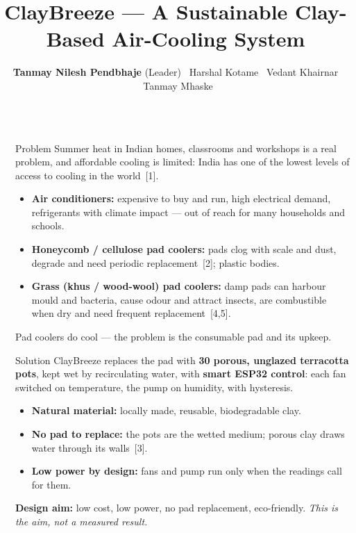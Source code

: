 \documentclass[final]{beamer}
\title{ClayBreeze --- A Sustainable Clay-Based Air-Cooling System}
\author{\textbf{Tanmay Nilesh Pendbhaje} (Leader) \textperiodcentered\ Harshal Kotame \textperiodcentered\ Vedant Khairnar \textperiodcentered\ Tanmay Mhaske}
\institute{Project Guide: \textbf{Dr.~Kiran Wakchaure} \textperiodcentered\ FY B.Tech Mechanical Engineering, Sanjivani University}
\date{}
\newlength{\sepwid}\setlength{\sepwid}{0.01\paperwidth}
\newlength{\firstcolwid}\setlength{\firstcolwid}{0.215\paperwidth}
\newcommand{\emphg}[1]{{\color{paloalto}\textbf{#1}}}
\newcommand{\emphr}[1]{{\color{cardinalred}\textbf{#1}}}
\begin{document}
\begin{frame}[t]
\begin{columns}[t]

\begin{column}{\sepwid}\end{column}

\begin{column}{\firstcolwid}

\begin{alertblock}{Problem}
Summer heat in Indian homes, classrooms and workshops is a real problem, and affordable cooling is limited: India has one of the lowest levels of access to cooling in the world~[1].
\begin{itemize}
\item \textbf{Air conditioners:} expensive to buy and run, high electrical demand, refrigerants with climate impact --- out of reach for many households and schools.
\item \textbf{Honeycomb / cellulose pad coolers:} pads clog with scale and dust, degrade and need periodic replacement~[2]; plastic bodies.
\item \textbf{Grass (khus / wood-wool) pad coolers:} damp pads can harbour mould and bacteria, cause odour and attract insects, are combustible when dry and need frequent replacement~[4,5].
\end{itemize}
Pad coolers do cool --- the problem is the consumable pad and its upkeep.
\end{alertblock}

\begin{block}{Solution}
ClayBreeze replaces the pad with \emphr{30 porous, unglazed terracotta pots}, kept wet by recirculating water, with \emphg{smart ESP32 control}: each fan switched on temperature, the pump on humidity, with hysteresis.
\begin{itemize}
\item \textbf{Natural material:} locally made, reusable, biodegradable clay.
\item \textbf{No pad to replace:} the pots are the wetted medium; porous clay draws water through its walls~[3].
\item \textbf{Low power by design:} fans and pump run only when the readings call for them.
\end{itemize}
\textbf{Design aim:} low cost, low power, no pad replacement, eco-friendly. \emph{This is the aim, not a measured result.}
\end{block}


\end{column}
\end{columns}
\end{frame}
\end{document}
